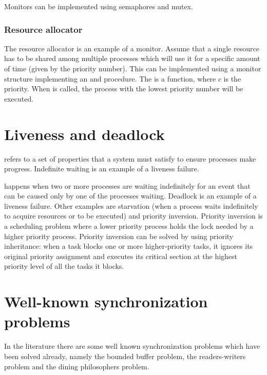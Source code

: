 
Monitors can be implemented using semaphores and mutex.

\subsubsection{Resource allocator}
The resource allocator is an example of a monitor. Assume that a single resource has to be shared among multiple processes which will use it for a specific amount of time (given by the priority number). This can be implemented using a monitor structure implementing an  and  procedure. The  is a  function, where $c$ is the priority. When  is called, the process with the lowest priority number will be executed.

\section{Liveness and deadlock}
 refers to a set of properties that a system must satisfy to ensure processes make progress. Indefinite waiting is an example of a liveness failure.

 happens when two or more processes are waiting indefinitely for an event that can be caused only by one of the processes waiting. Deadlock is an example of a liveness failure. Other examples are starvation (when a process waits indefinitely to acquire resources or to be executed) and priority inversion. Priority inversion is a scheduling problem where a lower priority process holds the lock needed by a higher priority process. Priority inversion can be solved by using priority inheritance: when a task blocks one or more higher-priority tasks, it ignores its original priority assignment and executes its critical section at the highest priority level of all the tasks it blocks.

\section{Well-known synchronization problems}
In the literature there are some well known synchronization problems which have been solved already, namely the bounded buffer problem, the readers-writers problem and the dining philosophers problem.

